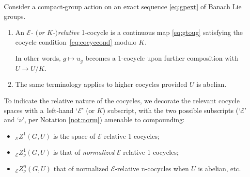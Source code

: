 \documentclass[pdftex]{sigma}
\numberwithin{equation}{section}
\newcommand\cE{{\mathcal E}}
\begin{document}
\begin{Definition}\label{def:relcocyc}
 Consider a compact-group action on an exact sequence \eqref{eq:gpext} of Banach Lie groups.
 \begin{enumerate}[(1)]\itemsep=0pt
 \item An {\it $\cE$- $($or $K$-$)$relative} 1-cocycle is a continuous map \eqref{eq:gtoug} satisfying the cocycle condition~\eqref{eq:cocyccond} modulo $K$.

 In other words, $g\mapsto u_g$ becomes a 1-cocycle upon further composition with $U\to U/K$.
 \item The same terminology applies to higher cocycles provided $U$ is abelian.
 \end{enumerate}
 To indicate the relative nature of the cocycles, we decorate the relevant cocycle spaces with a~left-hand `$\cE$' (or $K$) subscript, with the two possible subscripts (`$\cE$' and `$\nu$', per Notation \ref{not:norm}) amenable to compounding:
 \begin{itemize}\itemsep=0pt
 \item ${}_{\cE}Z^1(G,U)$ is the space of $\cE$-relative 1-cocycles;
 \item ${}_{\cE}Z^1_{\nu}(G,U)$ is that of {\it normalized} $\cE$-relative 1-cocycles;
 \item ${}_{\cE}Z^n_{\nu}(G,U)$ that of normalized $\cE$-relative n-cocycles when $U$ is abelian, etc.
 \end{itemize}
\end{Definition}
\end{document}
